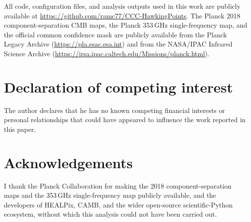 \documentclass[preprint,12pt,nonatbib]{elsarticle}
\begin{document}
All code, configuration files, and analysis outputs used in this work are publicly available at \url{https://github.com/ramc77/CCC-HawkingPoints}. The Planck 2018 component-separation CMB maps, the Planck 353\,GHz single-frequency map, and the official common confidence mask are publicly available from the Planck Legacy Archive (\url{https://pla.esac.esa.int}) and from the NASA/IPAC Infrared Science Archive (\url{https://irsa.ipac.caltech.edu/Missions/planck.html}).

\section*{Declaration of competing interest}

The author declares that he has no known competing financial interests or personal relationships that could have appeared to influence the work reported in this paper.

\section*{Acknowledgements}

I thank the Planck Collaboration for making the 2018 component-separation maps and the 353\,GHz single-frequency map publicly available, and the developers of HEALPix, CAMB, and the wider open-source scientific-Python ecosystem, without which this analysis could not have been carried out.
\end{document}
